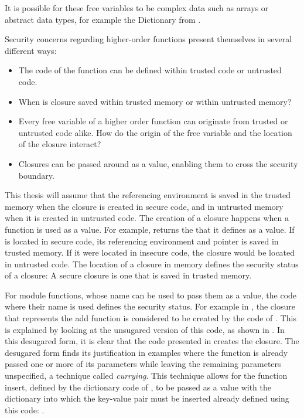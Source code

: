 \documentclass[10pt,a4paper,master=cws, masteroption=ai,english,inputenc=utf8]{kulemt}
\begin{document}
It is possible for these free variables to be complex data such as arrays or abstract data types, for example the Dictionary from . 

Security concerns regarding higher-order functions present themselves in several different ways:

\begin{itemize}
\item The code of the function can be defined within trusted code or untrusted code.
\item When is closure saved within trusted memory or within untrusted memory?
\item Every free variable of a higher order function can originate from trusted or untrusted code alike.
How do the origin of the free variable and the location of the closure interact?
\item Closures can be passed around as a value, enabling them to cross the security boundary.
\end{itemize}

This thesis will assume that the referencing environment is saved in the trusted memory when the closure is created in secure code, and in untrusted memory when it is created in untrusted code.
The creation of a closure happens when a function is used as a value.
For example,  returns the  that it defines as a value.
If  is located in secure code, its referencing environment and pointer is saved in trusted memory.
If it were located in insecure code, the closure would be located in untrusted code.
The location of a closure in memory defines the security status of a closure: A secure closure is one that is saved in trusted memory.

For module functions, whose name can be used to pass them as a value, the code where their name is used defines the security status.
For example in , the closure that represents the add function is considered to be created by the code of .
This is explained by looking at the unsugared version of this code, as shown in .
In this desugared form, it is clear that the code presented in  creates the closure.
The desugared form finds its justification in examples where the function is already passed one or more of its parameters while leaving the remaining parameters unspecified, a technique called \emph{currying}.
This technique allows for the function insert, defined by the dictionary code of , to be passed as a value with the dictionary into which the key-value pair must be inserted already defined using this code: .
\end{document}
